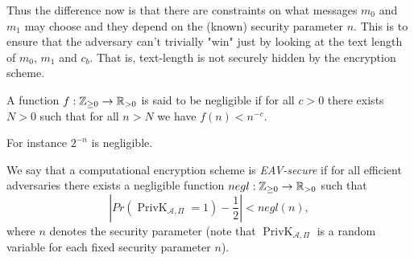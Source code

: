 \documentclass[twoside, a4paper, 10pt]{amsart}
\begin{document}
Thus the difference now is that there are constraints on what messages $m_0$ and $m_1$ may choose and they depend on the (known) security parameter $n$. This is to ensure that the adversary can't trivially "win" just by looking at the text length of $m_0$, $m_1$ and $c_b$. That is, text-length is not securely hidden by the encryption scheme.

\begin{mydef} A function $f:\mathbb{Z}_{\geq 0} \to \mathbb{R}_{>0}$ is said to be negligible if for all $c>0$ there exists $N>0$ such that for all $n>N$ we have $f(n) < n^{-c}$.

\end{mydef}

For instance $2^{-n}$ is negligible.

\begin{mydef} We say that a computational encryption scheme is \textit{EAV-secure} if for all efficient adversaries there exists a negligible function $negl:\mathbb{Z}_{\geq 0} \to \mathbb{R}_{>0}$ such that $$\left | Pr(\operatorname{PrivK}_{\mathcal{A}, \Pi} = 1) - \frac{1}{2} \right | < negl(n), $$ where $n$ denotes the security parameter (note that $\operatorname{PrivK}_{\mathcal{A}, \Pi}$ is a random variable for each fixed security parameter $n$).

\end{mydef}
\end{document}
